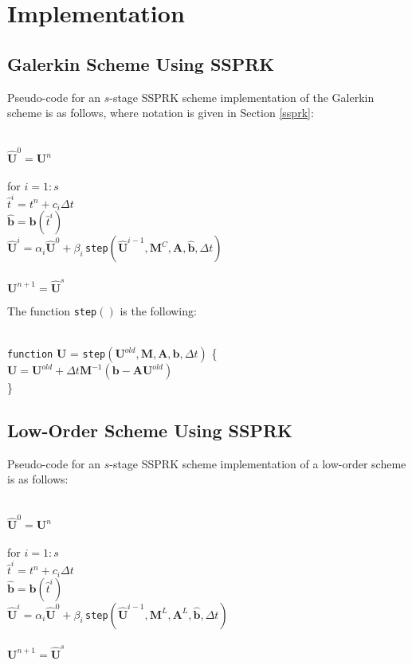 \section{Implementation}
\subsection{Galerkin Scheme Using SSPRK}\label{gal_ssprk}
Pseudo-code for an $s$-stage SSPRK scheme
implementation of the Galerkin scheme is as follows,
where notation is given in Section \ref{ssprk}:

{\noindent\\
$\hat{\mathbf{U}}^0 = \mathbf{U}^n$\\
\\
for $i=1:s$\\
\tab $\hat{t}^i = t^n+c_i\Delta t$\\
\tab $\hat{\mathbf{b}} = \mathbf{b}(\hat{t}^i)$\\
\tab $\hat{\mathbf{U}}^i = \alpha_i\hat{\mathbf{U}}^0
   + \beta_i\,$\texttt{step}$(\hat{\mathbf{U}}^{i-1},\mathbf{M}^C,
   \mathbf{A},\hat{\mathbf{b}},\Delta t)$\\
\\
$\mathbf{U}^{n+1} = \hat{\mathbf{U}}^s$\\
}

The function \texttt{step}$()$ is the following:

{\noindent\\
\texttt{function} $\mathbf{U}$ = \texttt{step}$(\mathbf{U}^{old},
   \mathbf{M},\mathbf{A},\mathbf{b},\Delta t)$ \{\\
\tab $\mathbf{U} = \mathbf{U}^{old} + \Delta t\mathbf{M}^{-1}
   (\mathbf{b} - \mathbf{A}\mathbf{U}^{old})$\\
\}\\
}
\subsection{Low-Order Scheme Using SSPRK}
Pseudo-code for an $s$-stage SSPRK scheme
implementation of a low-order scheme is as follows:

{\noindent\\
$\hat{\mathbf{U}}^0 = \mathbf{U}^n$\\
\\
for $i=1:s$\\
\tab $\hat{t}^i = t^n+c_i\Delta t$\\
\tab $\hat{\mathbf{b}} = \mathbf{b}(\hat{t}^i)$\\
\tab $\hat{\mathbf{U}}^i = \alpha_i\hat{\mathbf{U}}^0
   + \beta_i\,$\texttt{step}$(\hat{\mathbf{U}}^{i-1},\mathbf{M}^L,
   \mathbf{A}^L,\hat{\mathbf{b}},\Delta t)$\\
\\
$\mathbf{U}^{n+1} = \hat{\mathbf{U}}^s$\\
}


